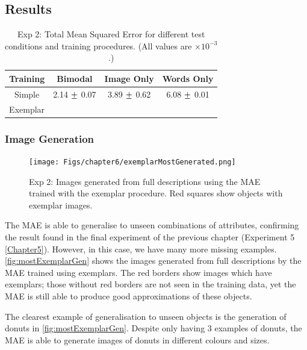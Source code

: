 \subsection{Results}

\begin{table}[h!]
\centering
	\begin{tabular}{|c|c|c|c|}
	\hline
\textbf{Training} & 	\textbf{Bimodal} & 	\textbf{Image Only} 	& 	\textbf{Words Only} \\ \hline
Simple &  2.14 $\mypm$	0.07 & 3.89 $\mypm$	0.62 & 6.08 $\mypm$ 0.01 \\ \hline
Exemplar & && \\ \hline

\end{tabular}
\caption{Exp 2: Total Mean Squared Error for different test conditions and training procedures. (All values are $\times10^{-3}$.)}
\label{tab:6_res_exp2}
\end{table}


\subsubsection{Image Generation}
\begin{figure}[ht]
    \centering
    \texttt{[image: Figs/chapter6/exemplarMostGenerated.png]}
    \caption{Exp 2: Images generated from full descriptions using the MAE trained with the exemplar procedure. Red squares show objects with exemplar images.}
    \label{fig:mostExemplarGen}
\end{figure}

The MAE is able to generalise to unseen combinations of attributes, confirming the result found in the final experiment of the previous chapter (Experiment 5 \autoref{Chapter5}). However, in this case, we have many more missing examples. \autoref{fig:mostExemplarGen} shows the images generated from full descriptions by the MAE trained using exemplars. The red borders show images which have exemplars; those without red borders are not seen in the training data, yet the MAE is still able to produce good approximations of these objects.

The clearest example of generalisation to unseen objects is the generation of donuts in \autoref{fig:mostExemplarGen}. Despite only having 3 examples of donuts, the MAE is able to generate images of donuts in different colours and sizes.  

